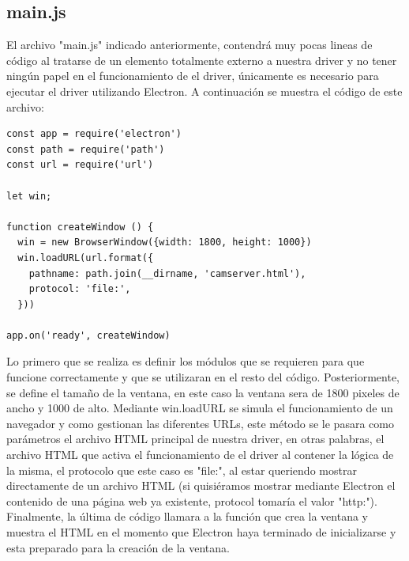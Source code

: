 \subsection{main.js}
El archivo "main.js" indicado anteriormente, contendrá muy pocas lineas de código al tratarse de un elemento totalmente externo a nuestra driver y no tener ningún papel en el funcionamiento de el driver, únicamente es necesario para ejecutar el driver utilizando Electron. A continuación se muestra el código de este archivo:
\begin{lstlisting}[frame=single]
const app = require('electron')
const path = require('path')
const url = require('url')

let win;

function createWindow () {
  win = new BrowserWindow({width: 1800, height: 1000})
  win.loadURL(url.format({
    pathname: path.join(__dirname, 'camserver.html'),
    protocol: 'file:',
  }))
  
app.on('ready', createWindow)

\end{lstlisting}
Lo primero que se realiza es definir los módulos que se requieren para que funcione correctamente y que se utilizaran en el resto del código. Posteriormente, se define el tamaño de la ventana, en este caso la ventana sera de 1800 pixeles de ancho y 1000 de alto. Mediante win.loadURL se simula el funcionamiento de un navegador y como gestionan las diferentes URLs, este método se le pasara como parámetros el archivo HTML principal de nuestra driver, en otras palabras, el archivo HTML que activa el funcionamiento de el driver al contener la lógica de la misma, el protocolo que este caso es "file:", al estar queriendo mostrar directamente de un archivo HTML (si quisiéramos mostrar mediante Electron el contenido de una página web ya existente, protocol tomaría el valor "http:"). Finalmente, la última de código llamara a la función que crea la ventana y muestra el HTML en el momento que Electron haya terminado de inicializarse y esta preparado para la creación de la ventana.

